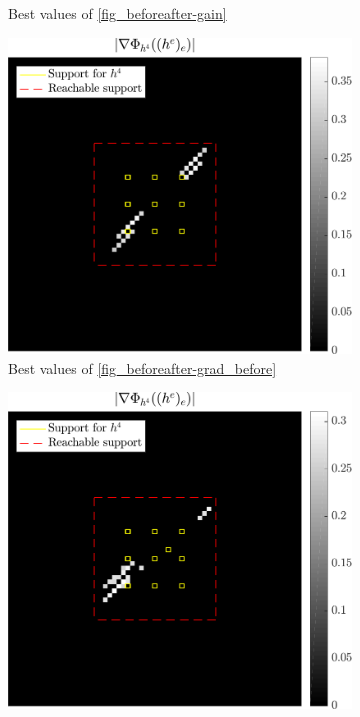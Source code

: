 \begin{figure}[!h]
\begin{subfigure}[b]{0.32\linewidth}
\caption{Best values of \ref{fig_beforeafter-gain}}\label{fig_beforeafter-gain_best}
\end{subfigure}
\begin{subfigure}[b]{0.32\linewidth}\centering
\includegraphics[width=\linewidth]{figures/before_after/xp_128x128_sc2_angl1_K3_S3_node4before_partgrad4_bestvalues.pdf}
\caption{Best values of \ref{fig_beforeafter-grad_before}}\label{fig_beforeafter-grad_before_best}
\end{subfigure}
\begin{subfigure}[b]{0.32\linewidth}\centering
\includegraphics[width=\linewidth]{figures/before_after/xp_128x128_sc2_angl1_K3_S3_node4after_partgrad4_bestvalues.pdf}

\end{subfigure}
\end{figure}
